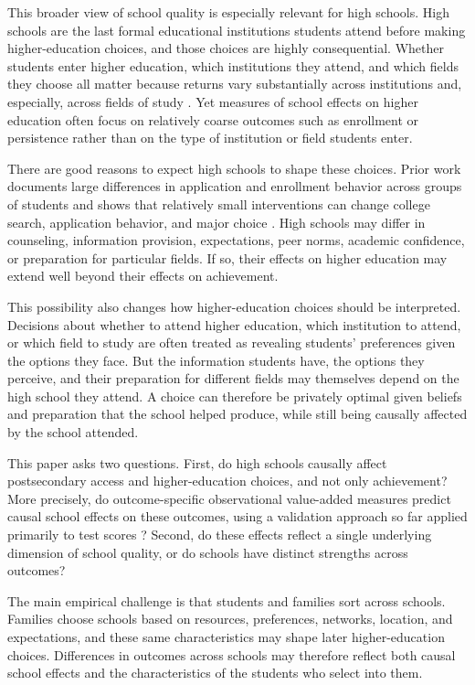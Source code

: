 \documentclass[a4paper, article, english, oneside, unknownkeysallowed, 12pt]{memoir}
\begin{document}
This broader view of school quality is especially relevant for high schools.
High schools are the last formal educational institutions students attend before making higher-education choices, and those choices are highly consequential.
Whether students enter higher education, which institutions they attend, and which fields they choose all matter because returns vary substantially across institutions and, especially, across fields of study \parencite{kirkeboen_field_2016}.
Yet measures of school effects on higher education often focus on relatively coarse outcomes such as enrollment or persistence rather than on the type of institution or field students enter.
 
There are good reasons to expect high schools to shape these choices.
Prior work documents large differences in application and enrollment behavior across groups of students and shows that relatively small interventions can change college search, application behavior, and major choice \parencite{hoxby_what_2015, dynarski_closing_2021, hastings_informed_2016, chetty_diversifying_2025}.
High schools may differ in counseling, information provision, expectations, peer norms, academic confidence, or preparation for particular fields.
If so, their effects on higher education may extend well beyond their effects on achievement.
 
This possibility also changes how higher-education choices should be interpreted.
Decisions about whether to attend higher education, which institution to attend, or which field to study are often treated as revealing students' preferences given the options they face.
But the information students have, the options they perceive, and their preparation for different fields may themselves depend on the high school they attend.
A choice can therefore be privately optimal given beliefs and preparation that the school helped produce, while still being causally affected by the school attended.
 
This paper asks two questions.
First, do high schools causally affect postsecondary access and higher-education choices, and not only achievement?
More precisely, do outcome-specific observational value-added measures predict causal school effects on these outcomes, using a validation approach so far applied primarily to test scores \parencite{angrist_leveraging_2017}?
Second, do these effects reflect a single underlying dimension of school quality, or do schools have distinct strengths across outcomes?
 
The main empirical challenge is that students and families sort across schools.
Families choose schools based on resources, preferences, networks, location, and expectations, and these same characteristics may shape later higher-education choices.
Differences in outcomes across schools may therefore reflect both causal school effects and the characteristics of the students who select into them.
 
\end{document}
